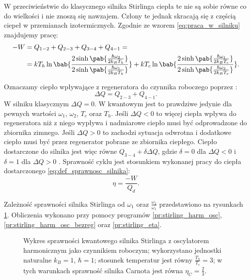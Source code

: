 W przeciwieństwie do klasycznego silnika Stirlinga ciepła te nie są sobie równe co do wielkości i nie znoszą się nawzajem. Człony te jednak skracają się z częścią ciepeł w przemianach izotermicznych. Zgodnie ze wzorem \eqref{eq:praca_w_silniku} znajdujemy pracę:
\begin{equation}
\begin{split}
	- W &= Q_{1-2} + Q_{2-3} + Q_{3-4} + Q_{4-1} = \\ &=
	kT_h \ln\bab{\frac{
	2\sinh\pab{\frac{\hbar\omega_2}{2k_B T_h}}
	}{
	2\sinh\pab{\frac{\hbar\omega_1}{2k_B T_h}}
	}} +
	kT_c \ln\bab{\frac{
	2\sinh\pab{\frac{\hbar\omega_1}{2k_B T_c}}
	}{
	2\sinh\pab{\frac{\hbar\omega_2}{2k_B T_c}}
	}}.
\end{split}
\end{equation}

Oznaczamy ciepło wpływające z regeneratora do czynnika roboczego poprzez \cite{myers}:
\begin{equation}
	\Delta Q = Q_{2-3} + Q_{4-1}.
\end{equation}
W silniku klasycznym \(\Delta Q = 0\). W kwantowym jest to prawdziwe jedynie dla pewnych wartości \(\omega_1\), \(\omega_2\), \(T_c\) oraz \(T_h\). Jeśli \(\Delta Q < 0\) to więcej ciepła wpływa do regeneratora niż z niego wypływa i nadmiarowe ciepło musi być odprowadzone do zbiornika zimnego. Jeśli \(\Delta Q > 0\) to zachodzi sytuacja odwrotna i dodatkowe ciepło musi być przez regenerator pobrane ze zbiornika ciepłego. Ciepło dostarczone do silnika jest więc równe \(Q_{3-4} + \delta\Delta Q\), gdzie \(\delta = 0\) dla \(\Delta Q < 0\) i \(\delta = 1\) dla \(\Delta Q > 0\) \cite{huang_stirling}. Sprawność cyklu jest stosunkiem wykonanej pracy do ciepła dostarczonego \eqref{eq:def_sprawnosc_silnika}:
\begin{equation}
	\eta = \frac{- W}{Q_d}.
\end{equation}

Zależność sprawności silnika Stirlinga od \(\omega_1\) oraz \(\frac{\omega_2}{\omega_1}\) przedstawiono na rysunkach \ref{fig:wykres_kw_stirling_osc_harm}. Obliczenia wykonano przy pomocy programów \ref{pr:stirling_harm_osc}, \ref{pr:stirling_harm_osc_bezreg} oraz \ref{pr:stirling_eta}.

\begin{figure}[h]
	\begin{subfigure}{0.45\textwidth}
		\centering
		
	\end{subfigure}
	\begin{subfigure}{0.45\textwidth}
		\centering
		
	\end{subfigure}
	\caption{Wykres sprawności kwantowego silnika Stirlinga z oscylatorem harmonicznym jako czynnikiem roboczym; wykorzystano jednostki naturalne \(k_B = 1\), \(\hbar = 1\); stosunek temperatur jest równy \(\frac{T_h}{T_c} = 3\); w tych warunkach sprawność silnika Carnota jest równa \(\eta_C = \frac{2}{3}\).}
	\label{fig:wykres_kw_stirling_osc_harm}
\end{figure}

